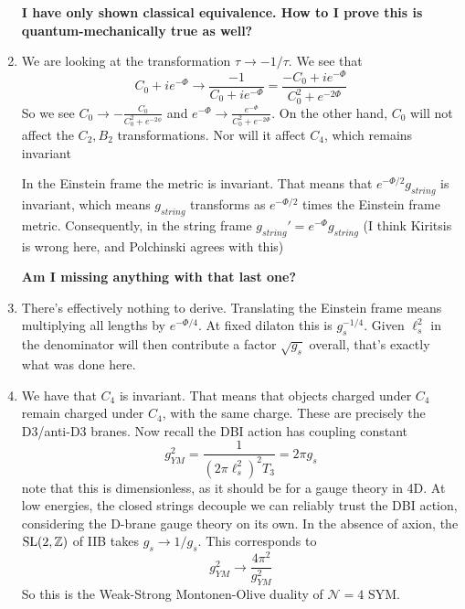 \documentclass[11pt, class=article, crop=false]{standalone}
\begin{document}
\begin{enumerate}
	\textbf{I have only shown classical equivalence. How to I prove this is quantum-mechanically true as well?}
	
	
	\item We are looking at the transformation $\tau \to -1/\tau$. We see that 
	\[
		C_0 + i e^{- \Phi} \to \frac{-1}{C_0 + i e^{- \Phi}} = \frac{-C_0 + i e^{- \Phi}}{C_0^2 + e^{-2\Phi}}
	\]
	So we see $C_0 \to - \frac{C_0}{C_0^2 + e^{-2\phi}}$ and $e^{-\Phi} \to \frac{e^{-\Phi}}{C_0^2 + e^{-2\Phi}}$. On the other hand, $C_0$ will not affect the $C_2, B_2$ transformations. Nor will it affect $C_4$, which remains invariant
	
	In the Einstein frame the metric is invariant. That means that $e^{-\Phi/2} g_{string}$ is invariant, which means $g_{string}$ transforms as $e^{-\Phi/2}$ times the Einstein frame metric. Consequently, in the string frame $g_{string}' = e^{-\Phi} g_{string}$ (I think Kiritsis is wrong here, and Polchinski agrees with this)

	\textbf{Am I missing anything with that last one?}
	
	\item There's effectively nothing to derive. Translating the Einstein frame means multiplying all lengths by $e^{-\Phi/4}$. At fixed dilaton this is $g_s^{-1/4}$. Given $\ell_s^2$ in the denominator will then contribute a factor $\sqrt{g_s}$ overall, that's exactly what was done here.  
	
	\item We have that $C_4$ is invariant. That means that objects charged under $C_4$ remain charged under $C_4$, with the same charge. These are precisely the D3/anti-D3 branes. Now recall the DBI action has coupling constant
	\[
		g_{YM}^2 = \frac{1}{(2\pi \ell_s^2)^2 T_3} = 2 \pi g_s
	\]
	note that this is dimensionless, as it should be for a gauge theory in 4D. At low energies, the closed strings decouple we can reliably trust the DBI action, considering the D-brane gauge theory on its own. In the absence of axion, the $\mathrm{SL}(2, \mathbb{Z})$ of IIB takes $g_s \to 1/g_s$. This corresponds to
	\[
		g^2_{YM} \to \frac{4\pi^2}{g_{YM}^2}
	\]
	So this is the Weak-Strong Montonen-Olive duality of $\mathcal N=4$ SYM.
	

\end{enumerate}
\end{document}
